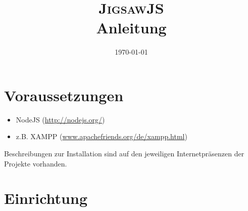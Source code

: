\documentclass[]{article}
\title{\textsc{JigsawJS} \\ Anleitung }
\author{ }
\date{\today}
\begin{document}
\ifpdf
{}
\else
{}
\fi

\maketitle

\section{Voraussetzungen} %
\label{sub:voraussetzungen}

\begin{itemize}
  \item NodeJS (\url{http://nodejs.org/})
  \item z.B. XAMPP (\url{www.apachefriends.org/de/xampp.html})
\end{itemize}

Beschreibungen zur Installation sind auf den jeweiligen Internetpräsenzen
der Projekte vorhanden.

\section{Einrichtung} %
\label{sub:installation}
\end{document}

